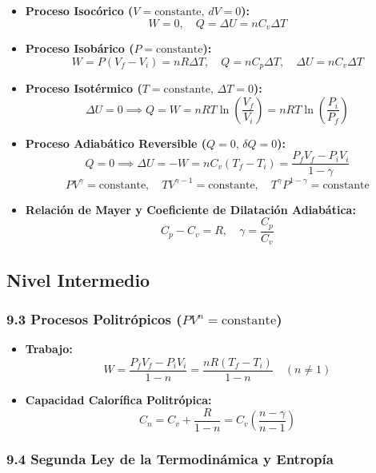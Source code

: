 \documentclass[11pt,a4paper]{article}
\begin{document}
\begin{itemize}
  \item \textbf{Proceso Isocórico ($V = \text{constante}, \, dV = 0$):}
  \[
    W = 0, \quad Q = \Delta U = n C_v \Delta T
  \]
  \item \textbf{Proceso Isobárico ($P = \text{constante}$):}
  \[
    W = P(V_f - V_i) = n R \Delta T, \quad Q = n C_p \Delta T, \quad \Delta U = n C_v \Delta T
  \]
  \item \textbf{Proceso Isotérmico ($T = \text{constante}, \, \Delta T = 0$):}
  \[
    \Delta U = 0 \implies Q = W = n R T \ln\left(\frac{V_f}{V_i}\right) = n R T \ln\left(\frac{P_i}{P_f}\right)
  \]
  \item \textbf{Proceso Adiabático Reversible ($Q = 0, \, \delta Q = 0$):}
  \[
    Q = 0 \implies \Delta U = -W = n C_v (T_f - T_i) = \frac{P_f V_f - P_i V_i}{1 - \gamma}
  \]
  \[
    P V^\gamma = \text{constante}, \quad T V^{\gamma - 1} = \text{constante}, \quad T^\gamma P^{1 - \gamma} = \text{constante}
  \]
  \item \textbf{Relación de Mayer y Coeficiente de Dilatación Adiabática:}
  \[
    C_p - C_v = R, \quad \gamma = \frac{C_p}{C_v}
  \]
\end{itemize}

\subsection*{Nivel Intermedio}

\subsubsection*{9.3 Procesos Politrópicos ($P V^n = \text{constante}$)}

\begin{itemize}
  \item \textbf{Trabajo:}
  \[
    W = \frac{P_f V_f - P_i V_i}{1 - n} = \frac{n R (T_f - T_i)}{1 - n} \quad (n \neq 1)
  \]
  \item \textbf{Capacidad Calorífica Politrópica:}
  \[
    C_n = C_v + \frac{R}{1 - n} = C_v \left( \frac{n - \gamma}{n - 1} \right)
  \]
\end{itemize}

\subsubsection*{9.4 Segunda Ley de la Termodinámica y Entropía}
\end{document}
